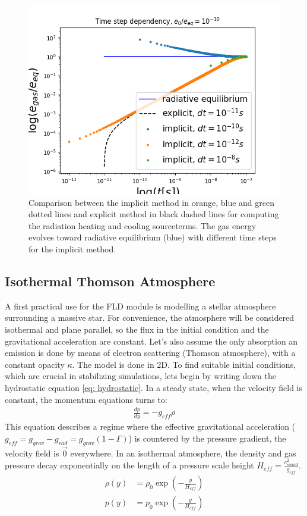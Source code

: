 \begin{figure}
\includegraphics[width = \textwidth]{test_sourceterms_dt.png}
\caption{Comparison between the implicit method in orange, blue and green dotted lines and explicit method in black dashed lines for computing the radiation heating and cooling sourceterms. The gas energy evolves toward radiative equilibrium (blue) with different time steps for the implicit method.}
\label{fig: test_sourceterms_dt}
\end{figure}

\subsection{Isothermal Thomson Atmosphere} \label{section: IsoAtm}
A first practical use for the FLD module is modelling a stellar atmosphere surrounding a massive star. For convenience, the atmosphere will be considered isothermal and plane parallel, so the flux in the initial condition and the gravitational acceleration are constant. Let's also assume the only absorption an emission is done by means of electron scattering (Thomson atmosphere), with a constant opacity $\kappa$. The model is done in 2D. To find suitable initial conditions, which are crucial in stabilizing simulations, lets begin by writing down the hydrostatic equation \eqref{eq: hydrostatic}. In a steady state, when the velocity field is constant, the momentum equations turns to:\\
\begin{align}
\frac{dp}{dy} = -g_{eff} \rho \label{eq: hydrostatic}
\end{align}
This equation describes a regime where the effective gravitational acceleration ($g_{eff} = g_{grav} - g_{rad} = g_{grav}(1 - \Gamma)$) is countered by the pressure gradient, the velocity field is $\vec{0}$ everywhere. In an isothermal atmosphere, the density and gas pressure decay exponentially on the length of a pressure scale height $H_{eff} = \frac{c_{sound}^2}{g_{eff}}$. 
\begin{align}
\rho(y) &= \rho_0 \exp \left( -\frac{y}{H_{eff}} \right) \\
 p(y)   &= p_0    \exp \left( -\frac{y}{H_{eff}} \right)
\end{align}


